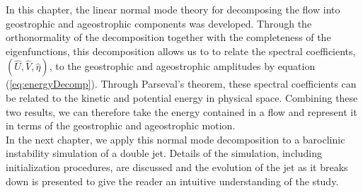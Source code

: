 In this chapter, the linear normal mode theory for decomposing the flow into geostrophic and ageostrophic components was developed. Through the orthonormality of the decomposition together with the completeness of the eigenfunctions, this decomposition allows us to to relate the spectral coefficients, $(\widehat{U},\widehat{V}, \widehat{\eta})$, to  the geostrophic and ageostrophic amplitudes by equation (\ref{eq:energyDecomp}). Through Parseval's theorem, these spectral coefficients can be related to the kinetic and potential energy in physical space. Combining these two results, we can therefore take the energy contained in a flow and represent it in terms of the geostrophic and ageostrophic motion.\\

In the next chapter, we apply this normal mode decomposition to a baroclinic instability simulation of a double jet. Details of the simulation, including initialization procedures, are discussed  and the evolution of the jet as it breaks down is presented to give the reader an intuitive understanding of the study.
